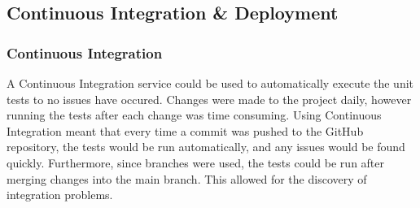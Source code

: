 \documentclass[12pt,a4paper]{article}
\begin{document}
\subsection{Continuous Integration \& Deployment}
\subsubsection{Continuous Integration}
A Continuous Integration service could be used to automatically execute the unit tests to no issues have occured. Changes were made to the project daily, however running the tests after each change was time consuming. Using Continuous Integration meant that every time a commit was pushed to the GitHub repository, the tests would be run automatically, and any issues would be found quickly. Furthermore, since branches were used, the tests could be run after merging changes into the main branch. This allowed for the discovery of integration problems.
\end{document}
